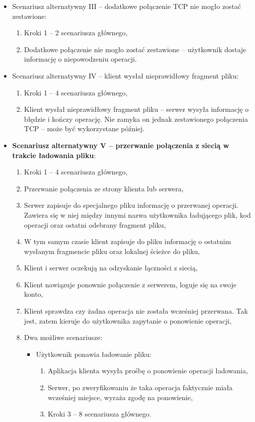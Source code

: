 \documentclass[10pt,a4paper]{article}
\begin{document}
\begin{itemize}
    \item Scenariusz alternatywny III -- dodatkowe połączenie TCP nie mogło zostać zestawione:
    \begin{enumerate}
        \item Kroki 1 -- 2 scenariusza głównego,
        \item Dodatkowe połączenie nie mogło zostać zestawione -- użytkownik dostaje informację o niepowodzeniu operacji.
    \end{enumerate}
    
    \item Scenariusz alternatywny IV -- klient wysłał nieprawidłowy fragment pliku:
    \begin{enumerate}
        \item Kroki 1 -- 4 scenariusza głównego,
        \item Klient wysłał nieprawidłowy fragment pliku -- serwer wysyła informację o błędzie i kończy operację. Nie zamyka on jednak zestawionego połączenia TCP -- może być wykorzystane później.
    \end{enumerate}
    
    \item \textbf{Scenariusz alternatywny V -- przerwanie połączenia z siecią w trakcie ładowania pliku}:
    \begin{enumerate}
        \item Kroki 1 -- 4 scenariusza głównego,
        \item Przerwanie połączenia ze strony klienta lub serwera,
        \item Serwer zapisuje do specjalnego pliku informację o przerwanej operacji. Zawiera się w niej między innymi nazwa użytkownika ładującego plik, kod operacji oraz ostatni odebrany fragment pliku,
        \item W tym samym czasie klient zapisuje do pliku informację o ostatnim wysłanym fragmencie pliku oraz lokalnej ścieżce do pliku,
        \item Klient i serwer oczekują na odzyskanie łączności z siecią,
        \item Klient nawiązuje ponownie połączenie z serwerem, loguje się na swoje konto,
        \item Klient sprawdza czy żadna operacja nie została wcześniej przerwana. Tak jest, zatem kieruje do użytkownika zapytanie o ponowienie operacji,
        \item Dwa możliwe scenariusze:
        \begin{itemize}
            \item Użytkownik ponawia ładowanie pliku:
            \begin{enumerate}
                \item Aplikacja klienta wysyła prośbę o ponowienie operacji ładowania,
                \item Serwer, po zweryfikowaniu że taka operacja faktycznie miała wcześniej miejsce, wyraża zgodę na ponowienie,
                \item Kroki 3 -- 8 scenariusza głównego.
            \end{enumerate}
            

\end{itemize}
\end{enumerate}
\end{itemize}
\end{document}
